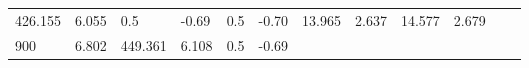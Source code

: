 \documentclass{article}
\begin{document}
\begin{longtable}[]{@{}llllllllllll@{}}
\begin{minipage}[t]{0.06\columnwidth}
426.155\strut
\end{minipage} & \begin{minipage}[t]{0.08\columnwidth}\raggedright\strut
6.055\strut
\end{minipage} & \begin{minipage}[t]{0.03\columnwidth}\raggedright\strut
0.5\strut
\end{minipage} & \begin{minipage}[t]{0.06\columnwidth}\raggedright\strut
-0.69\strut
\end{minipage} & \begin{minipage}[t]{0.03\columnwidth}\raggedright\strut
0.5\strut
\end{minipage} & \begin{minipage}[t]{0.06\columnwidth}\raggedright\strut
-0.70\strut
\end{minipage} & \begin{minipage}[t]{0.06\columnwidth}\raggedright\strut
13.965\strut
\end{minipage} & \begin{minipage}[t]{0.08\columnwidth}\raggedright\strut
2.637\strut
\end{minipage} & \begin{minipage}[t]{0.06\columnwidth}\raggedright\strut
14.577\strut
\end{minipage} & \begin{minipage}[t]{0.09\columnwidth}\raggedright\strut
2.679\strut
\end{minipage}\tabularnewline
\begin{minipage}[t]{0.03\columnwidth}\raggedright\strut
900\strut
\end{minipage} & \begin{minipage}[t]{0.06\columnwidth}\raggedright\strut
6.802\strut
\end{minipage} & \begin{minipage}[t]{0.06\columnwidth}\raggedright\strut
449.361\strut
\end{minipage} & \begin{minipage}[t]{0.08\columnwidth}\raggedright\strut
6.108\strut
\end{minipage} & \begin{minipage}[t]{0.03\columnwidth}\raggedright\strut
0.5\strut
\end{minipage} & \begin{minipage}[t]{0.06\columnwidth}\raggedright\strut
-0.69\strut
\end{minipage} & \begin{minipage}[t]{0.03\columnwidth}\raggedright\strut

\end{minipage}
\end{longtable}
\end{document}
